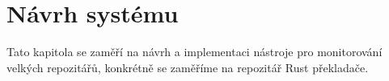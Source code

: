 \chapter{Návrh systému}
\label{chap:design}
Tato kapitola se zaměří na návrh a implementaci nástroje pro monitorování velkých repozitářů, konkrétně se zaměříme na repozitář Rust překladače.




